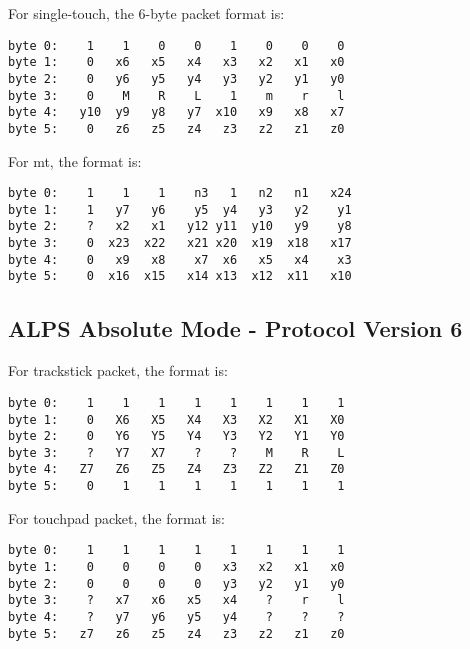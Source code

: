 \documentclass[a4paper,8pt,english]{sphinxmanual}
\begin{document}
For single-touch, the 6-byte packet format is:

\begin{Verbatim}[commandchars=\\\{\}]
byte 0:    1    1    0    0    1    0    0    0
byte 1:    0   x6   x5   x4   x3   x2   x1   x0
byte 2:    0   y6   y5   y4   y3   y2   y1   y0
byte 3:    0    M    R    L    1    m    r    l
byte 4:   y10  y9   y8   y7  x10   x9   x8   x7
byte 5:    0   z6   z5   z4   z3   z2   z1   z0
\end{Verbatim}

For mt, the format is:

\begin{Verbatim}[commandchars=\\\{\}]
byte 0:    1    1    1    n3   1   n2   n1   x24
byte 1:    1   y7   y6    y5  y4   y3   y2    y1
byte 2:    ?   x2   x1   y12 y11  y10   y9    y8
byte 3:    0  x23  x22   x21 x20  x19  x18   x17
byte 4:    0   x9   x8    x7  x6   x5   x4    x3
byte 5:    0  x16  x15   x14 x13  x12  x11   x10
\end{Verbatim}


\subsection{ALPS Absolute Mode - Protocol Version 6}
\label{input/devices/alps:alps-absolute-mode-protocol-version-6}
For trackstick packet, the format is:

\begin{Verbatim}[commandchars=\\\{\}]
byte 0:    1    1    1    1    1    1    1    1
byte 1:    0   X6   X5   X4   X3   X2   X1   X0
byte 2:    0   Y6   Y5   Y4   Y3   Y2   Y1   Y0
byte 3:    ?   Y7   X7    ?    ?    M    R    L
byte 4:   Z7   Z6   Z5   Z4   Z3   Z2   Z1   Z0
byte 5:    0    1    1    1    1    1    1    1
\end{Verbatim}

For touchpad packet, the format is:

\begin{Verbatim}[commandchars=\\\{\}]
byte 0:    1    1    1    1    1    1    1    1
byte 1:    0    0    0    0   x3   x2   x1   x0
byte 2:    0    0    0    0   y3   y2   y1   y0
byte 3:    ?   x7   x6   x5   x4    ?    r    l
byte 4:    ?   y7   y6   y5   y4    ?    ?    ?
byte 5:   z7   z6   z5   z4   z3   z2   z1   z0
\end{Verbatim}
\end{document}
